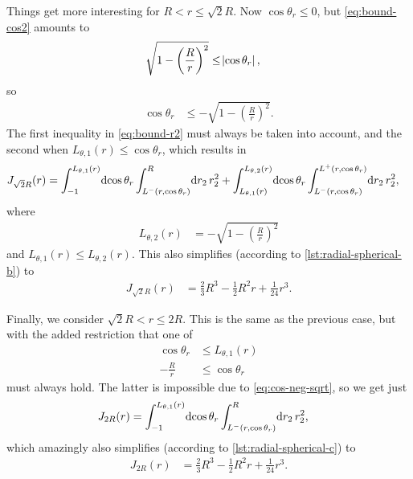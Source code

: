 Things get more interesting for $R < r \le \sqrt{2} R$.
Now $\cos{\theta_r} \le 0$, but \cref{eq:bound-cos2} amounts to
\begin{align}
	\sqrt{1 - \left( \frac{R}{r} \right)^2}
	&\le \abs{\cos{\theta_r}},
\end{align}
so
\begin{align}
	\cos{\theta_r}
	&\le -\sqrt{1 - \left( \frac{R}{r} \right)^2}.
		\label{eq:cos-neg-sqrt}
\end{align}
The first inequality in \cref{eq:bound-r2} must always be taken into account, and the second when $L_{\theta,1}(r) \le \cos{\theta_r}$, which results in
\begin{align}
	J_{\sqrt{2} R}(r)
	&= \int_{-1}^{L_{\theta,1}(r)}\! \dif \cos{\theta_r} \int_{L^-(r, \cos{\theta_r})}^R\! \dif r_2 \, r_2^2
		+ \int_{L_{\theta,1}(r)}^{L_{\theta,2}(r)}\! \dif \cos{\theta_r} \int_{L^-(r, \cos{\theta_r})}^{L^+(r, \cos{\theta_r})}\! \dif r_2 \, r_2^2,
			\label{eq:radial-spherical-b}
\end{align}
where
\begin{align}
	L_{\theta,2}(r)
	&= -\sqrt{1 - \left( \frac{R}{r} \right)^2}
\end{align}
and $L_{\theta,1}(r) \le L_{\theta,2}(r)$.
This also simplifies (according to \vref{lst:radial-spherical-b}) to
\begin{align}
	J_{\sqrt{2} R}(r)
	&= \frac{2}{3} R^3 - \frac{1}{2} R^2 r + \frac{1}{24} r^3.
\end{align}

Finally, we consider $\sqrt{2} R < r \le 2 R$.
This is the same as the previous case, but with the added restriction that one of
\begin{subequations}
\begin{align}
	\cos{\theta_r}
	&\le L_{\theta,1}(r) \\
	-\frac{R}{r}
	&\le \cos{\theta_r}
\end{align}
\end{subequations}
must always hold.
The latter is impossible due to \cref{eq:cos-neg-sqrt}, so we get just
\begin{align}
	J_{2 R}(r)
	&= \int_{-1}^{L_{\theta,1}(r)}\! \dif \cos{\theta_r} \int_{L^-(r, \cos{\theta_r})}^R\! \dif r_2 \, r_2^2,
			\label{eq:radial-spherical-c}
\end{align}
which amazingly also simplifies (according to \vref{lst:radial-spherical-c}) to
\begin{align}
	J_{2 R}(r)
	&= \frac{2}{3} R^3 - \frac{1}{2} R^2 r + \frac{1}{24} r^3.
\end{align}

